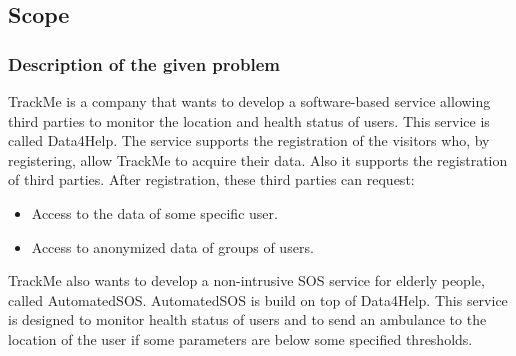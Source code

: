 \documentclass{article}
\begin{document}
\subsection{Scope}
\subsubsection{Description of the given problem}
TrackMe is a company that wants to develop a software-based service allowing third parties to monitor the location and health status of users. This service is called Data4Help. The service supports the registration of the visitors who, by registering, allow TrackMe to acquire their data. Also it supports the registration of third parties. After registration, these third parties can request: 
\begin{itemize}
	\item Access to the data of some specific user.
	\item Access to anonymized data of groups of users.
\end{itemize}
TrackMe also wants to develop a non-intrusive SOS service for elderly people, called AutomatedSOS. AutomatedSOS is build on top of Data4Help. This service is designed to monitor health status of users and to send an ambulance to the location of the user if some parameters are below some specified thresholds. 
\end{document}
